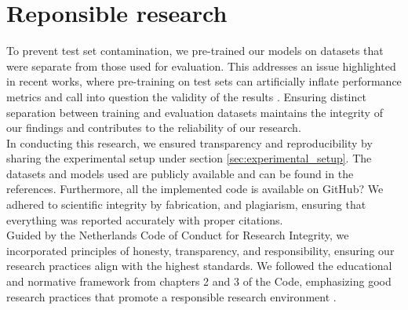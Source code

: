 \section{Reponsible research} %
\label{sec:responsible_research}
To prevent test set contamination, we pre-trained our models on datasets that were separate from those used for evaluation. This addresses an issue highlighted in recent works, where pre-training on test sets can artificially inflate performance metrics and call into question the validity of the results \cite{schaeffer2023pretraining}. Ensuring distinct separation between training and evaluation datasets maintains the integrity of our findings and contributes to the reliability of our research.
\\
In conducting this research, we ensured transparency and reproducibility by sharing the experimental setup under section \ref{sec:experimental_setup}. The datasets and models used are publicly available and can be found in the references. Furthermore, all the implemented code is available on GitHub? We adhered to scientific integrity by fabrication, and plagiarism, ensuring that everything was reported accurately with proper citations.
\\
Guided by the Netherlands Code of Conduct for Research Integrity, we incorporated principles of honesty, transparency, and responsibility, ensuring our research practices align with the highest standards. We followed the educational and normative framework from chapters 2 and 3 of the Code, emphasizing good research practices that promote a responsible research environment \cite{knaw2018integrity}. 